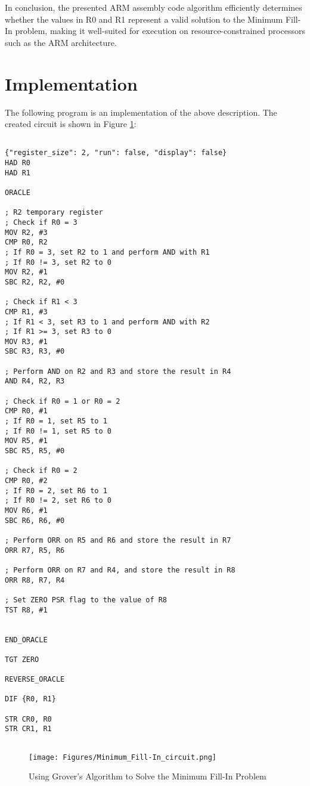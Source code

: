 In conclusion, the presented ARM assembly code algorithm efficiently determines whether the values in R0 and R1 represent a valid solution to the Minimum Fill-In problem, making it well-suited for execution on resource-constrained processors such as the ARM architecture.



\section{Implementation}

The following program is an implementation of the above description. The created circuit is shown in Figure \ref{fig:Minimum_Fill-In}:

\begin{lstlisting}

{"register_size": 2, "run": false, "display": false}
HAD R0
HAD R1

ORACLE

; R2 temporary register
; Check if R0 = 3
MOV R2, #3
CMP R0, R2
; If R0 = 3, set R2 to 1 and perform AND with R1
; If R0 != 3, set R2 to 0
MOV R2, #1
SBC R2, R2, #0

; Check if R1 < 3
CMP R1, #3
; If R1 < 3, set R3 to 1 and perform AND with R2
; If R1 >= 3, set R3 to 0
MOV R3, #1
SBC R3, R3, #0

; Perform AND on R2 and R3 and store the result in R4
AND R4, R2, R3

; Check if R0 = 1 or R0 = 2
CMP R0, #1
; If R0 = 1, set R5 to 1
; If R0 != 1, set R5 to 0
MOV R5, #1
SBC R5, R5, #0

; Check if R0 = 2
CMP R0, #2
; If R0 = 2, set R6 to 1
; If R0 != 2, set R6 to 0
MOV R6, #1
SBC R6, R6, #0

; Perform ORR on R5 and R6 and store the result in R7
ORR R7, R5, R6

; Perform ORR on R7 and R4, and store the result in R8
ORR R8, R7, R4

; Set ZERO PSR flag to the value of R8
TST R8, #1


END_ORACLE

TGT ZERO

REVERSE_ORACLE

DIF {R0, R1}

STR CR0, R0
STR CR1, R1


\end{lstlisting}

\begin{figure}[htp]
    \centering
    \texttt{[image: Figures/Minimum\_Fill-In\_circuit.png]}
    \caption{Using Grover's Algorithm to Solve the Minimum Fill-In Problem}
    \label{fig:Minimum_Fill-In}
\end{figure}

